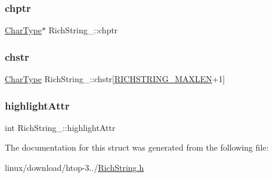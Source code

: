 \subsubsection{\texorpdfstring{chptr}{chptr}}
{\footnotesize\ttfamily \hyperlink{RichString_8h_a6d7a32b0391d3dc5b23cdb2442f9993a}{Char\+Type}$\ast$ Rich\+String\+\_\+\+::chptr}

\mbox{\label{structRichString___a9f6588f195edfe05c1fa7b3d811b49ab}} 
\subsubsection{\texorpdfstring{chstr}{chstr}}
{\footnotesize\ttfamily \hyperlink{RichString_8h_a6d7a32b0391d3dc5b23cdb2442f9993a}{Char\+Type} Rich\+String\+\_\+\+::chstr\mbox{[}\hyperlink{RichString_8h_ac992b99af185d6d1c0147ac407b2c146}{R\+I\+C\+H\+S\+T\+R\+I\+N\+G\+\_\+\+M\+A\+X\+L\+EN}+1\mbox{]}}

\mbox{\label{structRichString___aa29c2028a13bab264eba4d966b23a586}} 
\subsubsection{\texorpdfstring{highlight\+Attr}{highlightAttr}}
{\footnotesize\ttfamily int Rich\+String\+\_\+\+::highlight\+Attr}



The documentation for this struct was generated from the following file\+:\begin{DoxyCompactItemize}
\item 
linux/download/htop-\/3../\hyperlink{RichString_8h}{Rich\+String.\+h}\end{DoxyCompactItemize}
